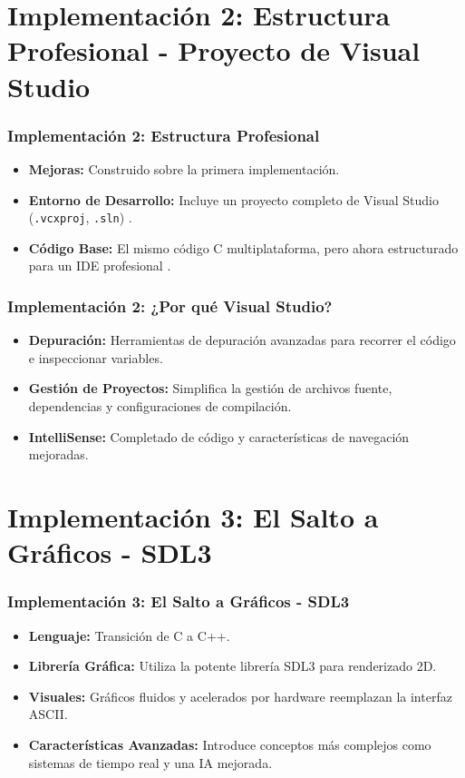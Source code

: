 \documentclass[]{beamer}
\begin{document}
\section{Implementación 2: Estructura Profesional - Proyecto de Visual Studio}
\begin{frame}
  \frametitle{Implementación 2: Estructura Profesional}
  \subtitle{\texttt{02-simple-visual-studio}: Organizado para el Desarrollo}
  \begin{itemize}
    \item \textbf{Mejoras:} Construido sobre la primera implementación.
    \item \textbf{Entorno de Desarrollo:} Incluye un proyecto completo de Visual Studio (\texttt{.vcxproj}, \texttt{.sln}) \cite{pong_vs_project, pong_vs_solution}.
    \item \textbf{Código Base:} El mismo código C multiplataforma, pero ahora estructurado para un IDE profesional \cite{pong_vs_main}.
  \end{itemize}
\end{frame}

\begin{frame}
  \frametitle{Implementación 2: ¿Por qué Visual Studio?}
  \begin{itemize}
    \item \textbf{Depuración:} Herramientas de depuración avanzadas para recorrer el código e inspeccionar variables.
    \item \textbf{Gestión de Proyectos:} Simplifica la gestión de archivos fuente, dependencias y configuraciones de compilación.
    \item \textbf{IntelliSense:} Completado de código y características de navegación mejoradas.
  \end{itemize}
\end{frame}

\section{Implementación 3: El Salto a Gráficos - SDL3}
\begin{frame}
  \frametitle{Implementación 3: El Salto a Gráficos - SDL3}
  \subtitle{\texttt{03-simple-visual-studio-sdl}: Un Enfoque Moderno}
  \begin{itemize}
    \item \textbf{Lenguaje:} Transición de C a C++.
    \item \textbf{Librería Gráfica:} Utiliza la potente librería SDL3 para renderizado 2D.
    \item \textbf{Visuales:} Gráficos fluidos y acelerados por hardware reemplazan la interfaz ASCII.
    \item \textbf{Características Avanzadas:} Introduce conceptos más complejos como sistemas de tiempo real y una IA mejorada.
  \end{itemize}
\end{frame}
\end{document}
